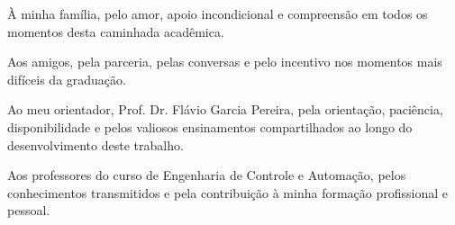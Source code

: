 À minha família, pelo amor, apoio incondicional e compreensão em todos os momentos desta caminhada acadêmica.

Aos amigos, pela parceria, pelas conversas e pelo incentivo nos momentos mais difíceis da graduação.

Ao meu orientador, Prof. Dr. Flávio Garcia Pereira, pela orientação, paciência, disponibilidade e pelos valiosos ensinamentos compartilhados ao longo do desenvolvimento deste trabalho.

Aos professores do curso de Engenharia de Controle e Automação, pelos conhecimentos transmitidos e pela contribuição à minha formação profissional e pessoal.